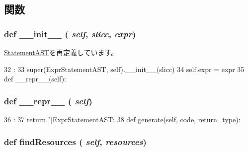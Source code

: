 \subsection{関数}
\hypertarget{classslicc_1_1ast_1_1ExprStatementAST_1_1ExprStatementAST_ac775ee34451fdfa742b318538164070e}{
\subsubsection[{\_\-\_\-init\_\-\_\-}]{\setlength{\rightskip}{0pt plus 5cm}def \_\-\_\-init\_\-\_\- ( {\em self}, \/   {\em slicc}, \/   {\em expr})}}
\label{classslicc_1_1ast_1_1ExprStatementAST_1_1ExprStatementAST_ac775ee34451fdfa742b318538164070e}


\hyperlink{classslicc_1_1ast_1_1StatementAST_1_1StatementAST_ac775ee34451fdfa742b318538164070e}{StatementAST}を再定義しています。


\begin{DoxyCode}
32                                    :
33         super(ExprStatementAST, self).__init__(slicc)
34         self.expr = expr
35 
    def __repr__(self):
\end{DoxyCode}
\hypertarget{classslicc_1_1ast_1_1ExprStatementAST_1_1ExprStatementAST_ad8b9328939df072e4740cd9a63189744}{
\subsubsection[{\_\-\_\-repr\_\-\_\-}]{\setlength{\rightskip}{0pt plus 5cm}def \_\-\_\-repr\_\-\_\- ( {\em self})}}
\label{classslicc_1_1ast_1_1ExprStatementAST_1_1ExprStatementAST_ad8b9328939df072e4740cd9a63189744}



\begin{DoxyCode}
36                       :
37         return "[ExprStatementAST: %
38 
    def generate(self, code, return_type):
\end{DoxyCode}
\hypertarget{classslicc_1_1ast_1_1ExprStatementAST_1_1ExprStatementAST_abd195c795639b490ba2de4c1246105f1}{
\subsubsection[{findResources}]{\setlength{\rightskip}{0pt plus 5cm}def findResources ( {\em self}, \/   {\em resources})}}
\label{classslicc_1_1ast_1_1ExprStatementAST_1_1ExprStatementAST_abd195c795639b490ba2de4c1246105f1}


